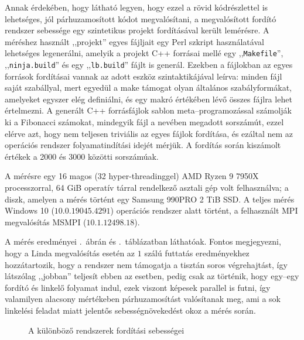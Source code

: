 Annak érdekében, hogy látható legyen, hogy ezzel a rövid kódrészlettel is lehetséges, jól párhuzamosított kódot megvalósítani, a megvalósított fordító rendszer sebessége egy szintetikus projekt fordításával került lemérésre.
A méréshez használt ,,projekt'' egyes fájljait egy Perl szkript használatával lehetséges legenerálni, amelyik a projekt C++ forrásai mellé egy ,,\texttt{Makefile}'', ,,\texttt{ninja.build}'' és egy ,,\texttt{lb.build}'' fájlt is generál.
Ezekben a fájlokban az egyes források fordításai vannak az adott eszköz szintaktikájával leírva: minden fájl saját szabállyal, mert egyedül a make támogat olyan általános szabályformákat, amelyeket egyszer elég definiálni, és egy makró értékében lévő összes fájlra lehet értelmezni.
A generált C++ forrásfájlok sablon meta--programozással számolják ki a Fibonacci számokat, mindegyik fájl a nevében megadott sorszámút, ezzel elérve azt, hogy nem teljesen triviális az egyes fájlok fordítása, és ezáltal nem az operációs rendszer folyamatindítási idejét mérjük.
A fordítás során kiszámolt értékek a 2000 és 3000 közötti sorszámúak.

A mérésre egy 16 magos (32 hyper-threadinggel) AMD Ryzen 9 7950X processzorral, 64 GiB operatív tárral rendelkező asztali gép volt felhasználva; a diszk, amelyen a mérés történt egy Samsung 990PRO 2 TiB SSD.
A teljes mérés Windows 10 ($10.0.19045.4291$) operációs rendszer alatt történt, a felhasznált MPI megvalósítás MSMPI ($10.1.12498.18$).

A mérés eredményei .~ábrán és .~táblázatban\label{hf:tbl-ref} láthatóak.
Fontos megjegyezni, hogy a Linda megvalósítás esetén az $1$ szálú futtatás eredményekhez hozzátartozik, hogy a rendszer nem támogatja a tisztán soros végrehajtást, így látszólag ,,jobban'' teljesít ebben az esetben, pedig csak az történik, hogy egy--egy fordító és linkelő folyamat indul, ezek viszont képesek parallel is futni, így valamilyen alacsony mértékeben párhuzamosítást valósítanak meg, ami a sok linkelési feladat miatt jelentős sebességnövekedést okoz a mérés során.

\begin{figure}[htb]
	\caption{A különböző rendszerek fordítási sebességei}
	\label{fig:bs-speed}
\end{figure}
	
